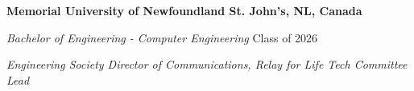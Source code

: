 \textbf{Memorial University of Newfoundland \hfill St. John's, NL, Canada} \par
\textit{Bachelor of Engineering - Computer Engineering} \hfill Class of 2026 \par
\textit{Engineering Society Director of Communications, Relay for Life Tech Committee Lead} \par